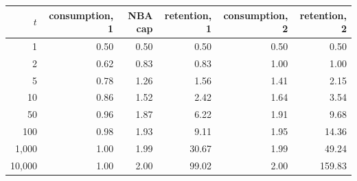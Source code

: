 \begin{tabular}{rrrrrr}
\toprule
$t$ & consumption, 1 & NBA cap & retention, 1 & consumption, 2 & retention, 2 \\
\midrule
1 & 0.50 & 0.50 & 0.50 & 0.50 & 0.50 \\
2 & 0.62 & 0.83 & 0.83 & 1.00 & 1.00 \\
5 & 0.78 & 1.26 & 1.56 & 1.41 & 2.15 \\
10 & 0.86 & 1.52 & 2.42 & 1.64 & 3.54 \\
50 & 0.96 & 1.87 & 6.22 & 1.91 & 9.68 \\
100 & 0.98 & 1.93 & 9.11 & 1.95 & 14.36 \\
1{,}000 & 1.00 & 1.99 & 30.67 & 1.99 & 49.24 \\
10{,}000 & 1.00 & 2.00 & 99.02 & 2.00 & 159.83 \\
\bottomrule
\end{tabular}
